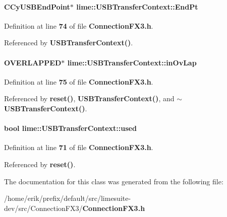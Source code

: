 \paragraph[{End\+Pt}]{\setlength{\rightskip}{0pt plus 5cm}C\+Cy\+U\+S\+B\+End\+Point$\ast$ lime\+::\+U\+S\+B\+Transfer\+Context\+::\+End\+Pt}\label{classlime_1_1USBTransferContext_afe61ba341f76ec040325426b77dc080a}


Definition at line {\bf 74} of file {\bf Connection\+F\+X3.\+h}.



Referenced by {\bf U\+S\+B\+Transfer\+Context()}.

\paragraph[{in\+Ov\+Lap}]{\setlength{\rightskip}{0pt plus 5cm}O\+V\+E\+R\+L\+A\+P\+P\+ED$\ast$ lime\+::\+U\+S\+B\+Transfer\+Context\+::in\+Ov\+Lap}\label{classlime_1_1USBTransferContext_a09a3c7a42c3eea3339cc54a001bcb3a3}


Definition at line {\bf 75} of file {\bf Connection\+F\+X3.\+h}.



Referenced by {\bf reset()}, {\bf U\+S\+B\+Transfer\+Context()}, and {\bf $\sim$\+U\+S\+B\+Transfer\+Context()}.

\paragraph[{used}]{\setlength{\rightskip}{0pt plus 5cm}bool lime\+::\+U\+S\+B\+Transfer\+Context\+::used}\label{classlime_1_1USBTransferContext_adfc8866b71e9335fba8628351feb0ea1}


Definition at line {\bf 71} of file {\bf Connection\+F\+X3.\+h}.



Referenced by {\bf reset()}.



The documentation for this class was generated from the following file\+:\begin{DoxyCompactItemize}
\item 
/home/erik/prefix/default/src/limesuite-\/dev/src/\+Connection\+F\+X3/{\bf Connection\+F\+X3.\+h}\end{DoxyCompactItemize}
